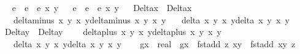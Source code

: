 \begin{isabellebody}
\ \isamarkupfalse%
\ e{}\ \ {\isachardoublequoteopen}e{}\ {\isacharequal}\ e\ x{}\ y{}{\isachardoublequoteclose}\isanewline
\ \isamarkupfalse%
\ e{}\ \ {\isachardoublequoteopen}e{}\ {\isacharequal}\ e\ x{}\ y{}{\isachardoublequoteclose}\isanewline
\ \isamarkupfalse%
\ Delta\isactrlsub x\ \ {\isachardoublequoteopen}Delta\isactrlsub x\ {\isacharequal}\ \isanewline
\ \ \ {\isacharparenleft}delta{\isacharunderscore}minus\ x{}{\isacharprime}\ y{}{\isacharprime}\ x{}\ y{}{\isacharparenright}{\isacharasterisk}{\isacharparenleft}delta{\isacharunderscore}minus\ x{}\ y{}\ x{}{\isacharprime}\ y{}{\isacharprime}{\isacharparenright}{\isacharasterisk}\isanewline
\ \ \ {\isacharparenleft}delta\ x{}\ y{}\ x{}\ y{}{\isacharparenright}{\isacharasterisk}{\isacharparenleft}delta\ x{}\ y{}\ x{}\ y{}{\isacharparenright}{\isachardoublequoteclose}\ \isanewline
\ \isamarkupfalse%
\ Delta\isactrlsub y\ \ {\isachardoublequoteopen}Delta\isactrlsub y\ {\isacharequal}\isanewline
\ \ \ {\isacharparenleft}delta{\isacharunderscore}plus\ x{}{\isacharprime}\ y{}{\isacharprime}\ x{}\ y{}{\isacharparenright}{\isacharasterisk}{\isacharparenleft}delta{\isacharunderscore}plus\ x{}\ y{}\ x{}{\isacharprime}\ y{}{\isacharprime}{\isacharparenright}{\isacharasterisk}\isanewline
\ \ \ {\isacharparenleft}delta\ x{}\ y{}\ x{}\ y{}{\isacharparenright}{\isacharasterisk}{\isacharparenleft}delta\ x{}\ y{}\ x{}\ y{}{\isacharparenright}{\isachardoublequoteclose}\ \isanewline
\ \isamarkupfalse%
\ g\isactrlsub x\ {\isacharcolon}{\isacharcolon}\ real\ \ {\isachardoublequoteopen}g\isactrlsub x\ {\isacharequal}\ fst{\isacharparenleft}add\ z{}{\isacharprime}\ {\isacharparenleft}x{}{\isacharcomma}y{}{\isacharparenright}{\isacharparenright}\ {\isacharminus}\ fst{\isacharparenleft}add\ {\isacharparenleft}x{}{\isacharcomma}y{}{\isacharparenright}\ z{}{\isacharprime}{\isacharparenright}{\isachardoublequoteclose}\isanewline

\end{isabellebody}

